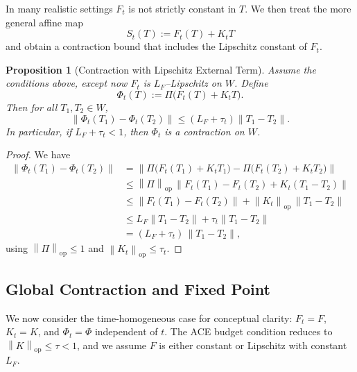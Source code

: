 \documentclass[11pt]{article}
\theoremstyle{definition}
\theoremstyle{plain}
\newtheorem{proposition}[definition]{Proposition}
\theoremstyle{remark}
\newcommand{\norm}[1]{\left\lVert #1 \right\rVert}
\begin{document}
In many realistic settings \(F_t\) is not strictly constant in \(T\).
We then treat the more general affine map
\[
  S_t(T) := F_t(T) + K_t T
\]
and obtain a contraction bound that includes the Lipschitz constant of \(F_t\).

\begin{proposition}[Contraction with Lipschitz External Term]
Assume the conditions above, except now \(F_t\) is \(L_F\)–Lipschitz on \(W\).
Define
\[
  \Phi_t(T) := \Pi\bigl(F_t(T) + K_t T\bigr).
\]
Then for all \(T_1,T_2 \in W\),
\[
  \norm{\Phi_t(T_1) - \Phi_t(T_2)}
  \le (L_F + \tau_t) \norm{T_1 - T_2}.
\]
In particular, if \(L_F + \tau_t < 1\), then \(\Phi_t\) is a contraction on \(W\).
\end{proposition}

\begin{proof}
We have
\begin{align*}
  \norm{\Phi_t(T_1) - \Phi_t(T_2)}
    &= \norm{\Pi\bigl(F_t(T_1) + K_t T_1\bigr) - \Pi\bigl(F_t(T_2) + K_t T_2\bigr)}\\
    &\le \norm{\Pi}_{\mathrm{op}}\, \norm{F_t(T_1) - F_t(T_2) + K_t(T_1 - T_2)}\\
    &\le \norm{F_t(T_1) - F_t(T_2)} + \norm{K_t}_{\mathrm{op}}\, \norm{T_1 - T_2}\\
    &\le L_F \norm{T_1 - T_2} + \tau_t \norm{T_1 - T_2}\\
    &= (L_F + \tau_t)\, \norm{T_1 - T_2},
\end{align*}
using \(\norm{\Pi}_{\mathrm{op}} \le 1\) and \(\norm{K_t}_{\mathrm{op}} \le \tau_t\).
\end{proof}

\subsection{Global Contraction and Fixed Point}

We now consider the time-homogeneous case for conceptual clarity: \(F_t = F\), \(K_t = K\), and \(\Phi_t = \Phi\) independent of \(t\).
The ACE budget condition reduces to \(\norm{K}_{\mathrm{op}} \le \tau < 1\), and we assume \(F\) is either constant or Lipschitz with constant \(L_F\).
\end{document}
